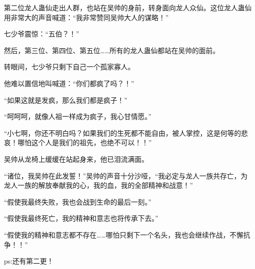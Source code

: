 \begin{this_body}
第二位龙人蛊仙走出人群，也站在吴帅的身前，转身面向龙人众仙。这位龙人蛊仙用非常大的声音喊道：“我非常赞同吴帅大人的谋略！”

七少爷震惊：“五伯？！”

然后，第三位、第四位、第五位……所有的龙人蛊仙都站在吴帅的面前。

转眼间，七少爷只剩下自己一个孤家寡人。

他难以置信地叫喊道：“你们都疯了吗？！”

“如果这就是发疯，那么我们都是疯子！”

“呵呵呵，就像人祖一样成为疯子，我心甘情愿。”

“小七啊，你还不明白吗？如果我们的生死都不能自由，被人掌控，这是何等的悲哀！哪怕这个人是我们的祖先，也绝不可以！！”

吴帅从龙椅上缓缓在站起身来，他已泪流满面。

“诸位，我吴帅在此发誓！”吴帅的声音十分沙哑，“我必定与龙人一族共存亡，为龙人一族的解放奉献我的心，我的血，我的全部精神和战意！”

“假使我最终失败，我也会战到生命的最后一刻。”

“假使我最终死亡，我的精神和意志也将传承下去。”

“假使我的精神和意志都不存在……哪怕只剩下一个名头，我也会继续作战，不懈抗争！！”

ps:还有第二更！

\end{this_body}

